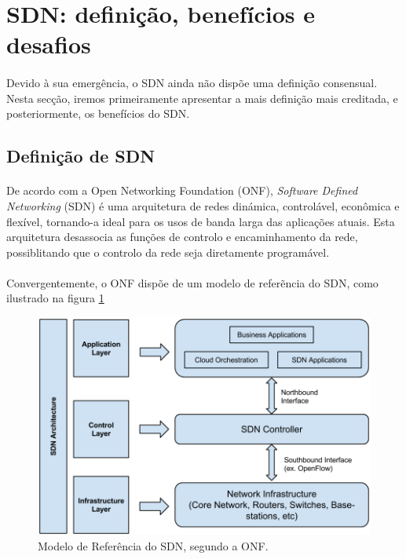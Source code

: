 \documentclass{llncs}
\begin{document}
 \paragraph{}
\section{SDN: definição, benefícios e desafios}
\paragraph{}
Devido à sua emergência, o SDN ainda não dispõe uma definição consensual.
Nesta secção, iremos primeiramente apresentar a mais definição mais creditada, e posteriormente, os benefícios do SDN.

\subsection{Definição de SDN}
\paragraph{}
De acordo com a Open Networking Foundation (ONF), \textit{Software Defined Networking} (SDN) é uma arquitetura de redes dinámica, controlável, econômica e flexível, tornando-a ideal para os usos de banda larga das aplicações atuais. 
Esta arquitetura desassocia as funções de controlo e encaminhamento da rede, possiblitando que o controlo da rede seja diretamente programável. \cite{fundation2012software}
\paragraph{}
Convergentemente, o ONF disp\~{o}e de um modelo de refer\~{e}ncia do SDN, como ilustrado na figura \ref{fig:architecture}
\begin{figure}
\begin{center}
\includegraphics[scale=0.40]{figura1.png}
\caption{Modelo de Referência do SDN, segundo a ONF.}
\label{fig:architecture}
\end{center}
\end{figure} 
\end{document}
